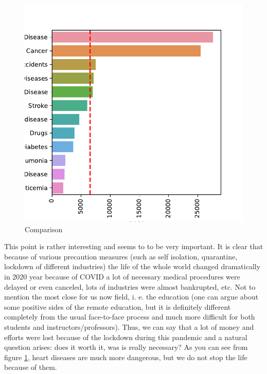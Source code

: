 \documentclass[conference]{IEEEtran}
\begin{document}
\begin{figure}
  \centering
  \includegraphics[width=0.9\columnwidth]{figs/yearly_deaths}
  \caption{Comparison}
  \label{fig:yearly_deaths}
\end{figure}


This point is rather interesting and seems to to be very  important. It is clear that because of various precaution measures (such as self isolation, quarantine, lockdown of different industries) the life of the whole world changed dramatically in 2020 year because of COVID a lot of necessary medical procedures were delayed or even canceled, lots of industries were almost bankrupted, etc. Not to mention the most close for us now field, i. e. the education (one can argue about some positive sides of the remote education, but it is definitely different completely from the usual face-to-face process and much more difficult for both students and instructors/professors). Thus, we can say that a lot of money and efforts were lost because of the lockdown during this pandemic and a natural question arises: does it worth it, was is really necessary? As you can see from figure \ref{fig:yearly_deaths}, heart diseases are much more dangerous, but we do not stop the life because of them.
\end{document}
